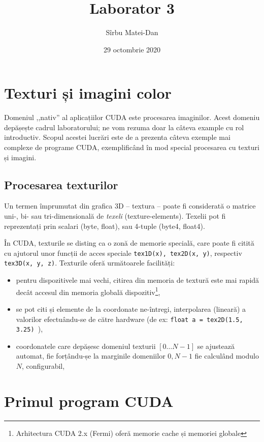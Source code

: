 \documentclass[9pt,a4paper]{article}
\title{\bf Laborator 3}
\author{Sîrbu Matei-Dan}
\date{29 octombrie 2020}
\begin{document}
\maketitle

\section{Texturi și imagini color}

Domeniul ,,nativ'' al aplicațiilor CUDA este procesarea imaginilor.\cite{andonie} Acest domeniu depășește cadrul laboratorului; ne vom rezuma doar la câteva example cu rol introductiv. Scopul acestei lucrări este de a prezenta câteva exemple mai complexe de programe CUDA, exemplificând în mod special procesarea cu texturi și imagini.

\subsection{Procesarea texturilor}
Un termen împrumutat din grafica 3D -- textura -- poate fi considerată o matrice uni-, bi- sau tri-dimensională de \textit{texeli} (texture-elements). Texelii pot fi reprezentați prin scalari (byte, float), sau 4-tuple (byte4, float4).

În CUDA, texturile se disting ca o zonă de memorie specială, care poate fi citită cu ajutorul unor funcții de acces speciale \texttt{tex1D(x), tex2D(x, y)}, respectiv \texttt{tex3D(x, y, z)}. Texturile oferă următoarele facilități:

\begin{itemize}
    \item pentru dispozitivele mai vechi, citirea din memoria de textură este mai  rapidă decât accesul din memoria globală dispozitiv\footnote{Arhitectura CUDA 2.x (Fermi) oferă memorie cache și memoriei globale},
    \item se pot citi și elemente de la coordonate ne-întregi, interpolarea (lineară) a valorilor efectuându-se de către hardware (de ex: \texttt{float a = tex2D(1.5, 3.25) }),
    \item coordonatele care depășesc domeniul texturii $[0\dots N-1]$ se ajustează automat, fie forțându-șe la marginile domeniilor $0, N-1$ fie calculând modulo $N$, configurabil, 
\end{itemize}

\newpage

\section*{Primul program CUDA}
\end{document}
